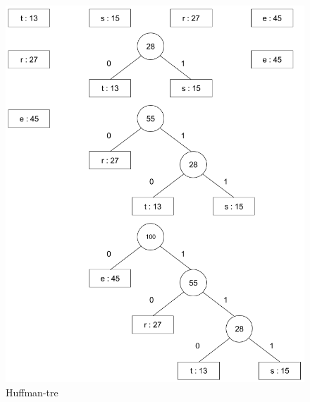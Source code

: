 \begin{boxed}
\begin{figure}[H]
\includegraphics[scale=0.47]{images/huffman}
\centering %
\caption{Huffman-tre}
\label{fig:huffman}
\end{figure}
\end{boxed}